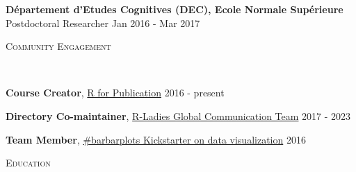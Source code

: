 \documentclass[9pt]{article}
\newenvironment{changemargin}[2]{%
  \begin{list}{}{%
    \setlength{\topsep}{0pt}%
    \setlength{\leftmargin}{#1}%
    \setlength{\rightmargin}{#2}%
    \setlength{\listparindent}{\parindent}%
    \setlength{\itemindent}{\parindent}%
    \setlength{\parsep}{\parskip}%
  }%
  \item[]}{\end{list}
}
\newcommand{\lineover}{
	\begin{changemargin}{-0.05in}{-0.05in}
		\vspace*{-8pt}
		\hrulefill \\
		\vspace*{-2pt}
	\end{changemargin}
}
\newcommand{\header}[1]{
	\begin{changemargin}{-0.5in}{-0.5in}
		\scshape{#1}\\
  	\lineover
	\end{changemargin}
}
\newenvironment{body} {
	\vspace*{-16pt}
	\begin{changemargin}{-0.25in}{-0.5in}
  }	
	{\end{changemargin}
}
\begin{document}
\begin{body}
	
	\textbf{D\'epartement d'Etudes Cognitives (DEC), Ecole Normale Sup\'erieure}\\
	Postdoctoral Researcher \hfill Jan 2016 - Mar 2017\\
	\medskip
	
\end{body}

\smallskip


\header{\color{red}Community Engagement}

\begin{body}
	\vspace{14pt}
	
	\textbf{Course Creator}, \href{https://pagepiccinini.com/r-course/}{\color{red}R for Publication} \hfill 2016 - present\\
	\medskip

	\textbf{Directory Co-maintainer}, \href{https://rladies.org/about-us/team/}{\color{red}R-Ladies Global Communication Team} \hfill 2017 - 2023\\
	\medskip
	


	\textbf{Team Member}, \href{https://barbarplots.github.io/}{\color{red}\#barbarplots Kickstarter on data visualization} \hfill 2016\\
	\medskip
		
\end{body}

\smallskip


\header{\color{red}Education}
\end{document}

